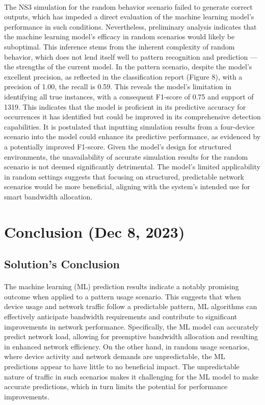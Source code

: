 \documentclass[10pt]{article}
\begin{document}
\paragraph{}
The NS3 simulation for the random behavior scenario failed to generate correct outputs, which has impeded a direct evaluation of the machine learning model's performance in such conditions. Nevertheless, preliminary analysis indicates that the machine learning model's efficacy in random scenarios would likely be suboptimal. This inference stems from the inherent complexity of random behavior, which does not lend itself well to pattern recognition and prediction — the strengths of the current model. In the pattern scenario, despite the model's excellent precision, as reflected in the classification report (Figure 8), with a precision of 1.00, the recall is 0.59. This reveals the model's limitation in identifying all true instances, with a consequent F1-score of 0.75 and support of 1319. This indicates that the model is proficient in its predictive accuracy for occurrences it has identified but could be improved in its comprehensive detection capabilities. It is postulated that inputting simulation results from a four-device scenario into the model could enhance its predictive performance, as evidenced by a potentially improved F1-score. Given the model's design for structured environments, the unavailability of accurate simulation results for the random scenario is not deemed significantly detrimental. The model's limited applicability in random settings suggests that focusing on structured, predictable network scenarios would be more beneficial, aligning with the system's intended use for smart bandwidth allocation.
    
\section{Conclusion (Dec 8, 2023)} %
\subsection{Solution's Conclusion}
\paragraph{}
The machine learning (ML) prediction results indicate a notably promising outcome when applied to a pattern usage scenario. This suggests that when device usage and network traffic follow a predictable pattern, ML algorithms can effectively anticipate bandwidth requirements and contribute to significant improvements in network performance. Specifically, the ML model can accurately predict network load, allowing for preemptive bandwidth allocation and resulting in enhanced network efficiency. On the other hand, in random usage scenarios, where device activity and network demands are unpredictable, the ML predictions appear to have little to no beneficial impact. The unpredictable nature of traffic in such scenarios makes it challenging for the ML model to make accurate predictions, which in turn limits the potential for performance improvements.
\end{document}
